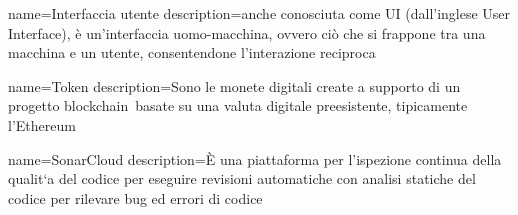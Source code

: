 {
	name={Interfaccia utente}
	description={anche conosciuta come UI (dall'inglese User Interface), è un'interfaccia uomo-macchina, ovvero ciò che si frappone tra una macchina e un utente, consentendone l'interazione reciproca}
}

{
	name={Token}
	description={Sono le monete digitali create a supporto di un progetto blockchain\glo\ basate su una valuta digitale preesistente, tipicamente l'Ethereum\glo}
}

{
	name={SonarCloud}
	description={È una piattaforma per l’ispezione continua della qualit`a del codice per eseguire revisioni automatiche con analisi statiche del codice per rilevare bug ed errori di codice}
}